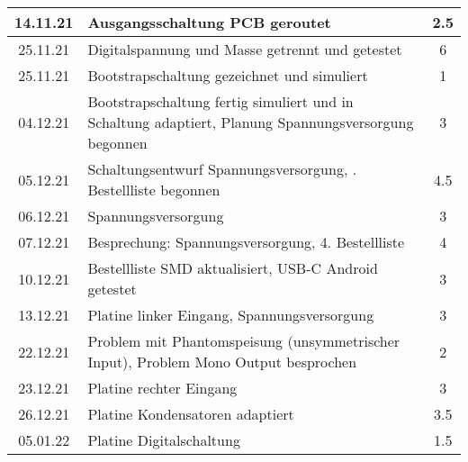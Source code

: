 \begin{longtable}{c|p{10cm}|c}
    14.11.21       & Ausgangsschaltung PCB geroutet                                                                         & 2.5                   \\ \hline
    25.11.21       & Digitalspannung und Masse getrennt und getestet                                                        & 6                     \\ \hline
    25.11.21       & Bootstrapschaltung gezeichnet und simuliert                                                            & 1                     \\ \hline
    04.12.21       & Bootstrapschaltung fertig simuliert und in Schaltung \newline adaptiert, Planung Spannungsversorgung begonnen & 3                     \\ \hline
    05.12.21       & Schaltungsentwurf Spannungsversorgung, \newline 4. Bestellliste   begonnen                                      & 4.5                   \\ \hline
    06.12.21       & Spannungsversorgung                                                                                    & 3                     \\ \hline
    07.12.21       & Besprechung: Spannungsversorgung, 4. Bestellliste                                                      & 4                     \\ \hline
    10.12.21       & Bestellliste SMD aktualisiert, USB-C Android getestet                                                  & 3                     \\ \hline
    13.12.21       & Platine linker Eingang, Spannungsversorgung                                                            & 3                     \\ \hline
    22.12.21       & Problem mit Phantomspeisung (unsymmetrischer \newline Input), Problem   Mono Output besprochen                  & 2                     \\ \hline
    23.12.21       & Platine rechter Eingang                                                                                & 3                     \\ \hline
    26.12.21       & Platine Kondensatoren adaptiert                                                                        & 3.5                   \\ \hline
    05.01.22       & Platine Digitalschaltung                                                                               & 1.5                   \\ \hline

\end{longtable}
